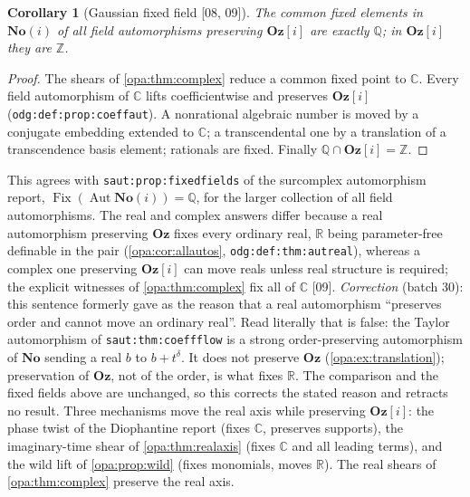 \documentclass[11pt,oneside]{article}
\numberwithin{equation}{section}
\newtheorem{corollary}[corollary]{Corollary}
\theoremstyle{definition}
\theoremstyle{remark}
\newcommand{\No}{\mathbf{No}}
\newcommand{\Oz}{\mathbf{Oz}}
\newcommand{\Og}{\mathbf{Oz}[i]}
\newcommand{\SC}{\mathbf{No}(i)}
\newcommand{\R}{\mathbb R}
\newcommand{\C}{\mathbb C}
\newcommand{\Q}{\mathbb Q}
\newcommand{\Z}{\mathbb Z}
\newcommand{\Aut}{\operatorname{Aut}}
\newcommand{\Fix}{\operatorname{Fix}}
\newcommand{\src}[1]{\textup{\textsf{\small[#1]}}}
\newcommand{\lbl}[1]{\nolinkurl{#1}}
\begin{document}
\begin{corollary}[Gaussian fixed field \src{08, 09}]\label{opa:cor:gaussianfixed}
The common fixed elements in $\SC$ of all field automorphisms preserving $\Og$ are
exactly $\Q$; in $\Og$ they are $\Z$.
\end{corollary}
\begin{proof}
The shears of \cref{opa:thm:complex} reduce a common fixed point to $\C$. Every field
automorphism of $\C$ lifts coefficientwise and preserves $\Og$
(\lbl{odg:def:prop:coeffaut}). A nonrational algebraic number is moved by a
conjugate embedding extended to $\C$; a transcendental one by a translation of a
transcendence basis element; rationals are fixed. Finally $\Q\cap\Og=\Z$.
\end{proof}

This agrees with \lbl{saut:prop:fixedfields} of the surcomplex automorphism report,
$\Fix(\Aut\SC)=\Q$, for the larger collection of all field automorphisms. The real
and complex answers differ because a real automorphism preserving $\Oz$ fixes every
ordinary real, $\R$ being parameter-free definable in the pair
(\cref{opa:cor:allautos}, \lbl{odg:def:thm:autreal}), whereas a complex one
preserving $\Og$ can move reals unless real structure is required; the explicit
witnesses of \cref{opa:thm:complex} fix all of $\C$ \src{09}. \emph{Correction}
(batch 30): this sentence formerly gave as the reason that a real automorphism
``preserves order and cannot move an ordinary real''. Read literally that is false:
the Taylor automorphism of \lbl{saut:thm:coeffflow} is a strong order-preserving
automorphism of $\No$ sending a real $b$ to $b+t^\delta$. It does not preserve $\Oz$
(\cref{opa:ex:translation}); preservation of $\Oz$, not of the order, is what fixes
$\R$. The comparison and the fixed fields above are unchanged, so this corrects the
stated reason and retracts no result. Three
mechanisms move the real axis while preserving $\Og$: the phase twist of the
Diophantine report (fixes $\C$, preserves supports), the imaginary-time shear of
\cref{opa:thm:realaxis} (fixes $\C$ and all leading terms), and the wild lift of
\cref{opa:prop:wild} (fixes monomials, moves $\R$). The real shears of
\cref{opa:thm:complex} preserve the real axis.
\end{document}

